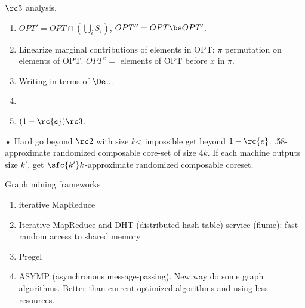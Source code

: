 $\rc3$ analysis.
\begin{enumerate}
\item
$OPT'=OPT\cap (\bigcup_i S_i)$, $OPT''=OPT\bs OPT'$.
\item
Linearize marginal contributions of elements in OPT: $\pi$ permutation on elements of OPT. $OPT^x=$ elements of OPT before $x$ in $\pi$. 
\item
Writing in terms of $\De$...
\item
\item
$(1-\rc{e})\rc3$.
\end{enumerate}•
Hard go beyond $\rc2$ with size $k$< impossible get beyond $1-\rc{e}$. .58-approximate randomized composable core-set of size $4k$.
If each machine outputs size $k'$, get $\sfc{k'}k$-approximate randomized composable coreset.

Graph mining frameworks
\begin{enumerate}
\item
iterative MapReduce
\item
Iterative MapReduce and DHT (distributed hash table) service (flume): fast random access to shared memory
\item
Pregel
\item
ASYMP (asynchronous message-passing). New way do some graph algorithms. Better than current optimized algorithms and using less resources.
\end{enumerate}